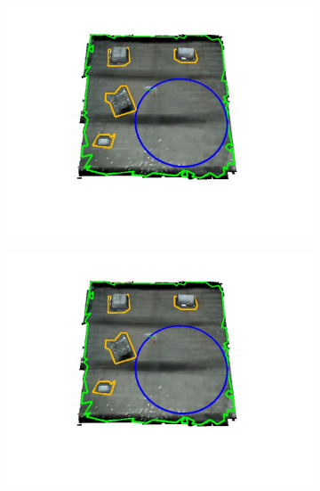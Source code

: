 \begin{figure}[!htb]
  \centering
  \begin{subfigure}[t]{.30\linewidth}
    \centering  \includegraphics[page=1,clip,trim=4cm 3cm 4cm 1.4cm,width=.99\linewidth]{chapter_7_experiments/imgs/mesh_flight.pdf}
    \caption{\label{fig:ch7_flight_mesh_a}}
  \end{subfigure}
  \begin{subfigure}[t]{.30\linewidth}
    \centering  \includegraphics[page=2,clip,trim=4cm 3cm 4cm 1.4cm,width=.99\linewidth]{chapter_7_experiments/imgs/mesh_flight.pdf}
    \caption{\label{fig:ch7_flight_mesh_b}}
  \end{subfigure}
  

\end{figure}
